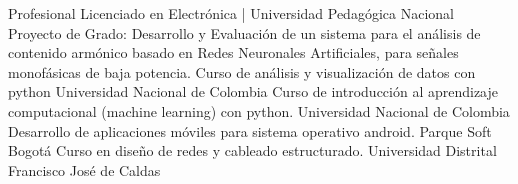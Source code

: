 %
%
%

\vspace{1em}
\begin{scholarship}
    {Profesional Licenciado en Electrónica | Universidad Pedagógica Nacional }
    {Proyecto de Grado: Desarrollo y Evaluación de un sistema para el análisis de contenido armónico basado en Redes Neuronales Artificiales, para señales monofásicas de baja potencia.}
    {Curso de análisis y visualización de datos con python}
    {Universidad Nacional de Colombia}
    {Curso de introducción al aprendizaje computacional (machine learning) con python.}
    {Universidad Nacional de Colombia}
    {Desarrollo de aplicaciones móviles para sistema operativo android.}
    {Parque Soft Bogotá}
    {Curso en diseño de redes y cableado estructurado.}
    {Universidad Distrital Francisco José de Caldas}
\end{scholarship}